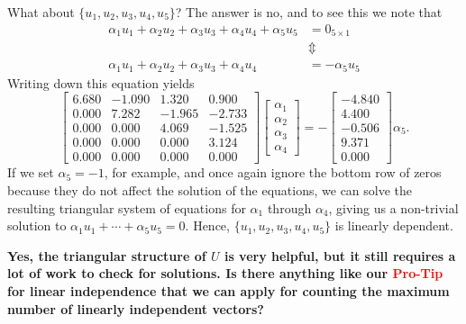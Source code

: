 What about $\{ u_1, u_2, u_3, u_4, u_5\}$? The answer is no, and to see this we note that 
\begin{align*} \alpha_1 u_1 +  \alpha_2 u_2 +  \alpha_3 u_3 + \alpha_4 u_4 + \alpha_5 u_5 &= 0_{5\times 1} \\
& \Updownarrow\\
\alpha_1 u_1 +  \alpha_2 u_2 +  \alpha_3 u_3 + \alpha_4 u_4 &= -\alpha_5 u_5
\end{align*}
Writing down this equation yields
$$\left[
\begin{array}{rrrrr}
\boxed{6.680} & -1.090 & 1.320 & 0.900 \\
0.000 & \boxed{7.282} & -1.965 & -2.733 \\
0.000 & 0.000 & \boxed{4.069} & -1.525  \\
0.000 & 0.000 & 0.000 & \boxed{3.124}  \\
0.000 & 0.000 &  0.000 & 0.000
\end{array}
\right] \left[
\begin{array}{r} \alpha_1 \\ \alpha_2  \\ \alpha_3 \\ \alpha_4\end{array}
\right]= - \left[ \begin{array}{r}
-4.840  \\4.400\\-0.506\\9.371\\ 0.000
\end{array} \right]  \alpha_5.
$$
If we set $\alpha_5=-1$, for example, and once again ignore the bottom row of zeros because they do not affect the solution of the equations, we can solve the resulting triangular system of equations for $\alpha_1$ through $\alpha_4$, giving us a non-trivial solution to $\alpha_1 u_1 + \cdots + \alpha_5 u_5=0$. Hence,  $\{ u_1, u_2, u_3, u_4, u_5 \}$ is linearly dependent. 
\Qed

\vspace*{0.5cm}
\textbf{Yes, the triangular structure of $U$ is very helpful, but it still requires a lot of work to check for solutions. Is there anything like our \textcolor{red}{\bf Pro-Tip} for linear independence that we can apply for counting the maximum number of linearly independent vectors?}


\vspace*{.2cm}

